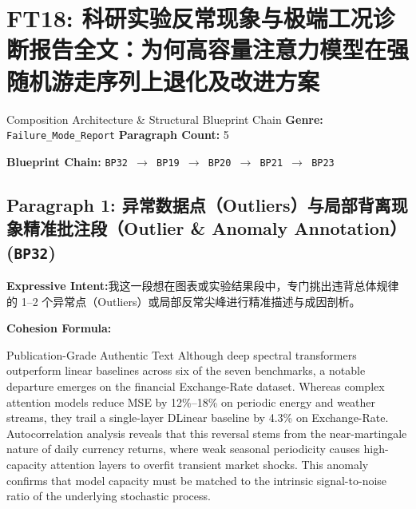\section{FT18: 科研实验反常现象与极端工况诊断报告全文：为何高容量注意力模型在强随机游走序列上退化及改进方案}\label{comp:FT18}
\begin{ConceptBox}{Composition Architecture \& Structural Blueprint Chain}
\textbf{Genre:} \texttt{Failure\_Mode\_Report} \quad \textbf{Paragraph Count:} 5\par
\textbf{Blueprint Chain:} \texttt{BP32 $\to$ BP19 $\to$ BP20 $\to$ BP21 $\to$ BP23}
\end{ConceptBox}
\subsection*{Paragraph 1: 异常数据点（Outliers）与局部背离现象精准批注段（Outlier \& Anomaly Annotation） (\texttt{BP32})}
\noindent\textbf{Expressive Intent:}\enspace 我这一段想在图表或实验结果段中，专门挑出违背总体规律的 1--2 个异常点（Outliers）或局部反常尖峰进行精准描述与成因剖析。\par
\noindent\textbf{Cohesion Formula:}\par\vspace{4pt}
\begin{ExampleBox}{Publication-Grade Authentic Text}
Although deep spectral transformers outperform linear baselines across six of the seven benchmarks, a notable departure emerges on the financial Exchange-Rate dataset. Whereas complex attention models reduce MSE by 12\%--18\% on periodic energy and weather streams, they trail a single-layer DLinear baseline by 4.3\% on Exchange-Rate. Autocorrelation analysis reveals that this reversal stems from the near-martingale nature of daily currency returns, where weak seasonal periodicity causes high-capacity attention layers to overfit transient market shocks. This anomaly confirms that model capacity must be matched to the intrinsic signal-to-noise ratio of the underlying stochastic process.
\end{ExampleBox}
